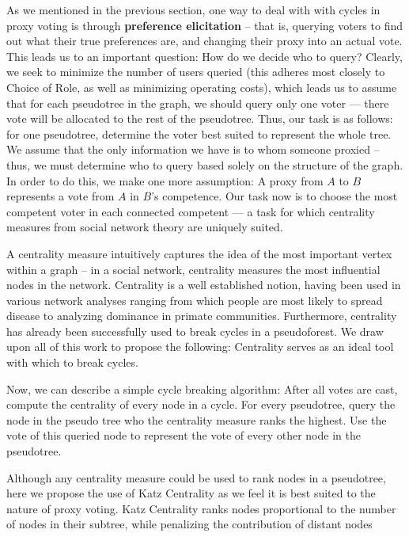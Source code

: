 \documentclass[10pt]{article}
\theoremstyle{definition}
\begin{document}
As we mentioned in the previous section, one way to deal with with cycles in proxy voting is through \textbf{preference elicitation} -- that is, querying voters to find out what their true preferences are, and changing their proxy into an actual vote. This leads us to an important question: How do we decide who to query? Clearly, we seek to minimize the number of users queried (this adheres most closely to Choice of Role, as well as minimizing operating costs), which leads us to assume that for each pseudotree in the graph, we should query only one voter --- there vote will be allocated to the rest of the pseudotree. Thus, our task is as follows: for one pseudotree, determine the voter best suited to represent the whole tree. We assume that the only information we have is to whom someone proxied -- thus, we must determine who to query based solely on the structure of the graph. In order to do this, we make one more assumption: A proxy from $A$ to $B$ represents a vote from $A$ in $B$'s competence. Our task now is to choose the most competent voter in each connected competent --- a task for which centrality measures from social network theory are uniquely suited.

A centrality measure intuitively captures the idea of the most important vertex within a graph -- in a social network, centrality measures the most influential nodes in the network.\cite{centrality}\cite{cwiki} Centrality is a well established notion, having been used in various network analyses ranging from which people are most likely to spread disease to analyzing dominance in primate communities. Furthermore, centrality has already been successfully used to break cycles in a pseudoforest.\cite{wikipedia} We draw upon all of this work to propose the following: Centrality serves as an ideal tool with which to break cycles. 

Now, we can describe a simple cycle breaking algorithm: After all votes are cast, compute the centrality of every node in a cycle. For every pseudotree, query the node in the pseudo tree who the centrality measure ranks the highest. Use the vote of this queried node to represent the vote of every other node in the pseudotree.

Although any centrality measure could be used to rank nodes in a pseudotree, here we propose the use of Katz Centrality as we feel it is best suited to the nature of proxy voting. Katz Centrality ranks nodes proportional to the number of nodes in their subtree, while penalizing the contribution of distant nodes
\end{document}
